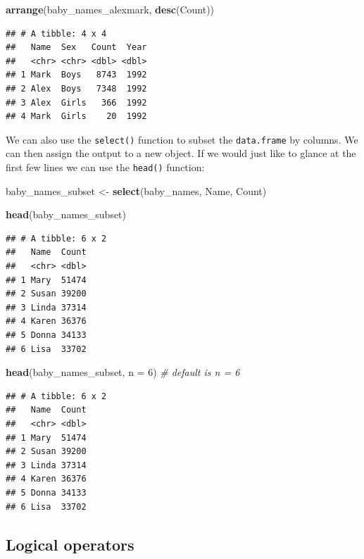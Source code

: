 \documentclass[
]{book}
\newenvironment{Shaded}{\begin{snugshade}}{\end{snugshade}}
\newcommand{\CommentTok}[1]{\textcolor[rgb]{0.56,0.35,0.01}{\textit{#1}}}
\newcommand{\DataTypeTok}[1]{\textcolor[rgb]{0.13,0.29,0.53}{#1}}
\newcommand{\DecValTok}[1]{\textcolor[rgb]{0.00,0.00,0.81}{#1}}
\newcommand{\KeywordTok}[1]{\textcolor[rgb]{0.13,0.29,0.53}{\textbf{#1}}}
\newcommand{\NormalTok}[1]{#1}
\newcommand{\StringTok}[1]{\textcolor[rgb]{0.31,0.60,0.02}{#1}}
\begin{document}
\begin{Shaded}
\begin{Highlighting}[]
\KeywordTok{arrange}\NormalTok{(baby_names_alexmark, }\KeywordTok{desc}\NormalTok{(Count))}
\end{Highlighting}
\end{Shaded}

\begin{verbatim}
## # A tibble: 4 x 4
##   Name  Sex   Count  Year
##   <chr> <chr> <dbl> <dbl>
## 1 Mark  Boys   8743  1992
## 2 Alex  Boys   7348  1992
## 3 Alex  Girls   366  1992
## 4 Mark  Girls    20  1992
\end{verbatim}

We can also use the \texttt{select()} function to subset the \texttt{data.frame}
by columns. We can then assign the output to a new object. If we
would just like to glance at the first few lines we can use the
\texttt{head()} function:

\begin{Shaded}
\begin{Highlighting}[]
\NormalTok{baby_names_subset <-}\StringTok{ }\KeywordTok{select}\NormalTok{(baby_names, Name, Count)}

\KeywordTok{head}\NormalTok{(baby_names_subset)}
\end{Highlighting}
\end{Shaded}

\begin{verbatim}
## # A tibble: 6 x 2
##   Name  Count
##   <chr> <dbl>
## 1 Mary  51474
## 2 Susan 39200
## 3 Linda 37314
## 4 Karen 36376
## 5 Donna 34133
## 6 Lisa  33702
\end{verbatim}

\begin{Shaded}
\begin{Highlighting}[]
\KeywordTok{head}\NormalTok{(baby_names_subset, }\DataTypeTok{n =} \DecValTok{6}\NormalTok{) }\CommentTok{# default is n = 6}
\end{Highlighting}
\end{Shaded}

\begin{verbatim}
## # A tibble: 6 x 2
##   Name  Count
##   <chr> <dbl>
## 1 Mary  51474
## 2 Susan 39200
## 3 Linda 37314
## 4 Karen 36376
## 5 Donna 34133
## 6 Lisa  33702
\end{verbatim}

\hypertarget{logical-operators}{%
\subsection{Logical operators}\label{logical-operators}}
\end{document}
